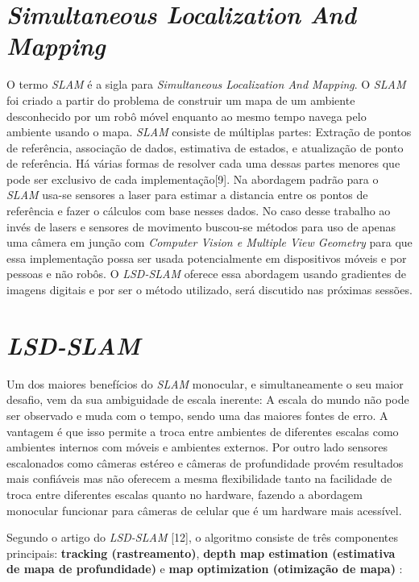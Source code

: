 \section{\textit{Simultaneous Localization And Mapping}}

O termo \textit{SLAM} é a sigla para \textit{Simultaneous Localization And Mapping}. O \textit{SLAM} foi criado a partir do problema de construir um mapa de um ambiente desconhecido por um robô móvel enquanto ao mesmo tempo navega pelo ambiente usando o mapa. \textit{SLAM} consiste de múltiplas partes: Extração de pontos de referência, associação de dados, estimativa de estados, e atualização de ponto de referência. Há várias formas de resolver cada uma dessas partes menores que pode ser exclusivo de cada implementação[9]. Na abordagem padrão para o \textit{SLAM} usa-se sensores a laser para estimar a distancia entre os pontos de referência e fazer o cálculos com base nesses dados. No caso desse trabalho ao invés de lasers e sensores de movimento buscou-se métodos para uso de apenas uma câmera em junção com \textit{Computer Vision e Multiple View Geometry} para que essa implementação possa ser usada potencialmente em dispositivos móveis e por pessoas e não robôs. O \textit{LSD-SLAM} oferece essa abordagem usando gradientes de imagens digitais e por ser o método utilizado, será discutido nas próximas sessões.

\section{\textit{LSD-SLAM}}

Um dos maiores benefícios do \textit{SLAM} monocular, e simultaneamente o seu maior desafio, vem da sua ambiguidade de escala inerente: A escala do mundo não pode ser observado e muda com o tempo, sendo uma das maiores fontes de erro. A vantagem é que isso permite a troca entre ambientes de diferentes escalas como ambientes internos com móveis e ambientes externos. Por outro lado sensores escalonados como câmeras estéreo e câmeras de profundidade provém resultados mais confiáveis mas não oferecem a mesma flexibilidade tanto na facilidade de troca entre diferentes escalas quanto no hardware, fazendo a abordagem monocular funcionar para câmeras de celular que é um hardware mais acessível. 

Segundo o artigo do \textit{LSD-SLAM} [12], o algoritmo consiste de três componentes principais: \textbf{tracking (rastreamento)}, \textbf{depth map estimation (estimativa de mapa de profundidade)} e \textbf{map optimization (otimização de mapa)} :

